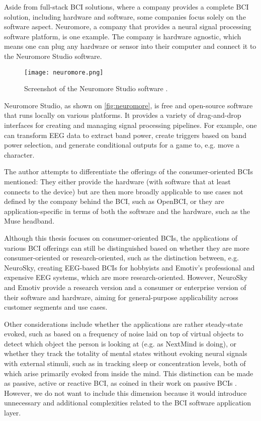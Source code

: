 Aside from full-stack BCI solutions, where a company provides a complete BCI solution, including hardware and software, some companies focus solely on the software aspect. Neuromore, a company that provides a neural signal processing software platform, is one example. The company is hardware agnostic, which means one can plug any hardware or sensor into their computer and connect it to the Neuromore Studio software.

\begin{figure}[ht]
  \centering
  \texttt{[image: neuromore.png]}
  \caption{Screenshot of the Neuromore Studio software \citep{neuromore_neuromore_nodate}.}
  \label{fig:neuromore}
\end{figure}

Neuromore Studio, as shown on \autoref{fig:neuromore}, is free and open-source software that runs locally on various platforms. It provides a variety of drag-and-drop interfaces for creating and managing signal processing pipelines. For example, one can transform EEG data to extract band power, create triggers based on band power selection, and generate conditional outputs for a game to, e.g. move a character.

The author attempts to differentiate the offerings of the consumer-oriented BCIs mentioned: They either provide the hardware (with software that at least connects to the device) but are then more broadly applicable to use cases not defined by the company behind the BCI, such as OpenBCI, or they are application-specific in terms of both the software and the hardware, such as the Muse headband.

Although this thesis focuses on consumer-oriented BCIs, the applications of various BCI offerings can still be distinguished based on whether they are more consumer-oriented or research-oriented, such as the distinction between, e.g. NeuroSky, creating EEG-based BCIs for hobbyists and Emotiv's professional and expensive EEG systems, which are more research-oriented. However, NeuroSky and Emotiv provide a research version and a consumer or enterprise version of their software and hardware, aiming for general-purpose applicability across customer segments and use cases.

Other considerations include whether the applications are rather steady-state evoked, such as based on a frequency of noise laid on top of virtual objects to detect which object the person is looking at (e.g. as NextMind is doing), or whether they track the totality of mental states without evoking neural signals with external stimuli, such as in tracking sleep or concentration levels, both of which arise primarily evoked from inside the mind. This distinction can be made as passive, active or reactive BCI, as \citeauthor{alimardani_passive_2020} coined in their work on passive BCIs \citep{alimardani_passive_2020}. However, we do not want to include this dimension because it would introduce unnecessary and additional complexities related to the BCI software application layer.

